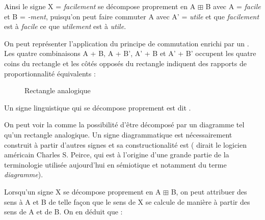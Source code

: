 Ainsi le signe X = \textit{facilement} se décompose proprement en A ${\boxplus}$ B avec A = \textit{facile} et B = \textit{{}-ment}, puisqu’on peut faire commuter A avec A’ = \textit{utile} et que \textit{facilement} est à \textit{facile} ce que \textit{utilement} est à \textit{utile}.

On peut représenter l’application du principe de commutation enrichi par un . Les quatre combinaisons A + B, A + B’, A’ + B et A’ + B’ occupent les quatre coins du rectangle et les côtés opposés du rectangle indiquent des rapports de proportionnalité équivalents :

\begin{figure}
\caption{\label{fig:}Rectangle analogique}
\end{figure}


{Un signe linguistique qui se décompose proprement est dit .}

On peut voir la  comme la possibilité d’être décomposé par un diagramme tel qu’un rectangle analogique. Un signe diagrammatique est nécessairement construit à partir d’autres signes et sa constructionalité est  ( dirait le logicien américain Charles S. Peirce, qui est à l’origine d’une grande partie de la terminologie utilisée aujourd’hui en sémiotique et notamment du terme \textit{diagramme}).

Lorsqu’un signe X se décompose proprement en A ${\boxplus}$ B, on peut attribuer des sens à A et B de telle façon que le sens de X se calcule de manière  à partir des sens de A et de B. On en déduit que :

